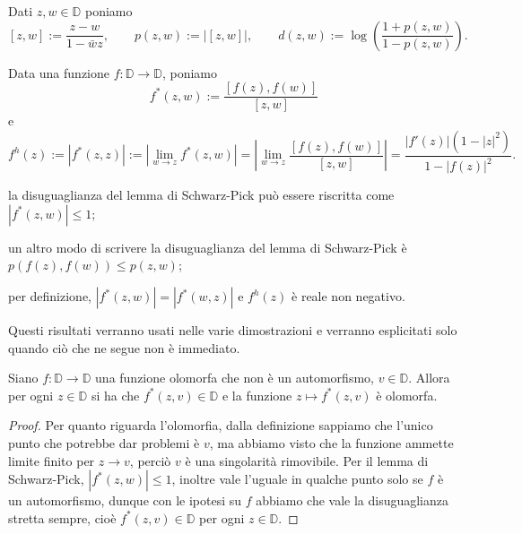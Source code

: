 
\begin{defn}
  Dati $z, w \in \mathbb{D}$ poniamo
  $$[z,w]:=\frac{z-w}{1-\bar{w}z}, \qquad p(z,w):=|[z,w]|, \qquad d(z,w):=\log\left(\frac{1+p(z,w)}{1-p(z,w)}\right).$$
\end{defn}

\begin{defn}
  Data una funzione $f: \mathbb{D} \longrightarrow \mathbb{D}$, poniamo
  $$f^*(z,w):=\frac{[f(z),f(w)]}{[z,w]}$$
  e
  $$f^h(z):=|f^*(z,z)|:=\left|\lim_{w \longrightarrow z} f^*(z,w)\right|=\left|\lim_{w \longrightarrow z} \frac{[f(z),f(w)]}{[z,w]}\right|=\frac{|f'(z)|(1-|z|^2)}{1-|f(z)|^2}.$$
\end{defn}

\begin{oss}
  \begin{nlist}
    \item la disuguaglianza del lemma di Schwarz-Pick può essere riscritta come $|f^*(z,w)| \le 1$;
    \item  un altro modo di scrivere la disuguaglianza del lemma di Schwarz-Pick è $p(f(z),f(w)) \le p(z,w)$;
    \item per definizione, $|f^*(z,w)|=|f^*(w,z)|$ e $f^h(z)$ è reale non negativo.
  \end{nlist}
  Questi risultati verranno usati nelle varie dimostrazioni e verranno esplicitati solo quando ciò che ne segue non è immediato.
\end{oss}

\begin{prop} \label{24}
  Siano $f:\mathbb{D} \longrightarrow \mathbb{D}$ una funzione olomorfa che non è un automorfismo, $v \in \mathbb{D}$. Allora per ogni $z \in \mathbb{D}$ si ha che $f^*(z,v) \in \mathbb{D}$ e la funzione $z \longmapsto f^*(z,v)$ è olomorfa.
\end{prop}

\begin{proof}
  Per quanto riguarda l'olomorfia, dalla definizione sappiamo che l'unico punto che potrebbe dar problemi è $v$, ma abbiamo visto che la funzione ammette limite finito per $z \longrightarrow v$, perciò $v$ è una singolarità rimovibile. Per il lemma di Schwarz-Pick, $|f^*(z,w)| \le 1$, inoltre vale l'uguale in qualche punto solo se $f$ è un automorfismo, dunque con le ipotesi su $f$ abbiamo che vale la disuguaglianza stretta sempre, cioè $f^*(z,v) \in \mathbb{D}$ per ogni $z \in \mathbb{D}$.
\end{proof}

